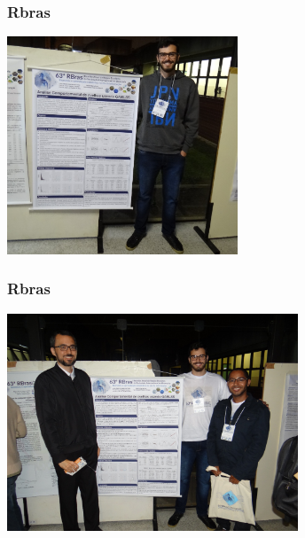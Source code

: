 \documentclass[10pt,
  aspectratio=169,
  serif,
  mathserif,
  professionalfont,
  compress,
  handout,
  ]{beamer}\usepackage[]{graphicx}\usepackage[]{color}
\begin{document}
\begin{frame}

\frametitle{Rbras}

\begin{center}
  \includegraphics[height=6.5cm]{img/rbras3.jpg}
\end{center}

\end{frame}


\begin{frame}

\frametitle{Rbras}

\begin{center}
  \includegraphics[height=6.5cm]{img/rbras2.jpg}
\end{center}

\end{frame}

\end{document}
